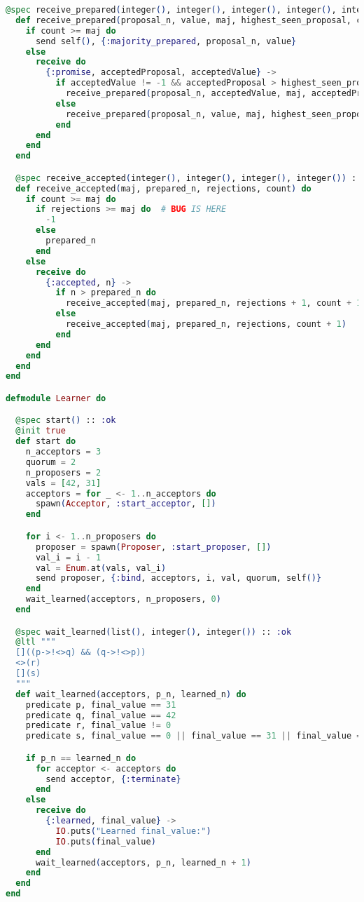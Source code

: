 \begin{lstlisting}[language=Elixir, xleftmargin=.1\linewidth]
  @spec receive_prepared(integer(), integer(), integer(), integer(), integer()) :: :ok
  def receive_prepared(proposal_n, value, maj, highest_seen_proposal, count) do
    if count >= maj do
      send self(), {:majority_prepared, proposal_n, value}
    else
      receive do
        {:promise, acceptedProposal, acceptedValue} ->
          if acceptedValue != -1 && acceptedProposal > highest_seen_proposal do
            receive_prepared(proposal_n, acceptedValue, maj, acceptedProposal, count + 1)
          else
            receive_prepared(proposal_n, value, maj, highest_seen_proposal, count + 1)
          end
      end
    end
  end

  @spec receive_accepted(integer(), integer(), integer(), integer()) :: integer()
  def receive_accepted(maj, prepared_n, rejections, count) do
    if count >= maj do
      if rejections >= maj do  # BUG IS HERE
        -1
      else
        prepared_n
      end
    else
      receive do
        {:accepted, n} ->
          if n > prepared_n do
            receive_accepted(maj, prepared_n, rejections + 1, count + 1)
          else
            receive_accepted(maj, prepared_n, rejections, count + 1)
          end
      end
    end
  end
end

defmodule Learner do

  @spec start() :: :ok
  @init true
  def start do
    n_acceptors = 3
    quorum = 2
    n_proposers = 2
    vals = [42, 31]
    acceptors = for _ <- 1..n_acceptors do
      spawn(Acceptor, :start_acceptor, [])
    end

    for i <- 1..n_proposers do
      proposer = spawn(Proposer, :start_proposer, [])
      val_i = i - 1
      val = Enum.at(vals, val_i)
      send proposer, {:bind, acceptors, i, val, quorum, self()}
    end
    wait_learned(acceptors, n_proposers, 0)
  end

  @spec wait_learned(list(), integer(), integer()) :: :ok
  @ltl """
  []((p->!<>q) && (q->!<>p))
  <>(r)
  [](s)
  """
  def wait_learned(acceptors, p_n, learned_n) do
    predicate p, final_value == 31
    predicate q, final_value == 42
    predicate r, final_value != 0
    predicate s, final_value == 0 || final_value == 31 || final_value == 42

    if p_n == learned_n do
      for acceptor <- acceptors do
        send acceptor, {:terminate}
      end
    else
      receive do
        {:learned, final_value} ->
          IO.puts("Learned final_value:")
          IO.puts(final_value)
      end
      wait_learned(acceptors, p_n, learned_n + 1)
    end
  end
end

\end{lstlisting}

